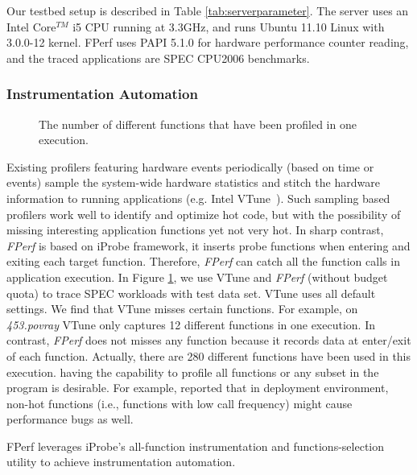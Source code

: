 Our testbed setup is described in Table \ref{tab:serverparameter}.
The server uses an Intel Core$^{TM}$ i5 CPU running at 3.3GHz, and runs Ubuntu 11.10 Linux with 3.0.0-12 kernel.
FPerf uses PAPI 5.1.0 for hardware performance counter reading, and the traced applications are SPEC CPU2006 benchmarks.

\subsubsection{Instrumentation Automation}

\begin{figure}[h!]
    \begin{center}       
    \end{center}
    \caption{The number of different functions that have been profiled in one execution.}
    \label{fig:motiv}
\end{figure}


Existing profilers featuring hardware events periodically 
(based on time or events) sample the system-wide 
hardware statistics and stitch the hardware
information to running applications (e.g. Intel VTune~\cite{vtune}).
Such sampling based profilers work well to identify and optimize hot code,
but with the possibility of missing 
interesting application functions yet not very hot.
In sharp contrast, \textit{FPerf} is based on iProbe framework, 
it inserts probe functions when entering and exiting each target function.
Therefore, \textit{FPerf} can catch all the function calls in application
execution. In Figure \ref{fig:motiv}, we use VTune and \textit{FPerf} (without budget quota) 
to trace SPEC workloads with test data set. VTune uses all default settings. We find 
that VTune misses certain functions. For example, on {\em 453.povray} VTune only captures 
12 different functions in one execution. In contrast, \textit{FPerf}
does not misses any function because it records data
at enter/exit of each function. Actually, there
are 280 different functions have been used in this execution. 
having the capability to profile all functions or any subset in the program is desirable.
For example, \cite{Jovic:2011} reported that in deployment environment, non-hot functions (i.e.,
functions with low call frequency) might cause performance bugs as well. 

FPerf leverages iProbe's all-function instrumentation and functions-selection utility to achieve instrumentation automation.


